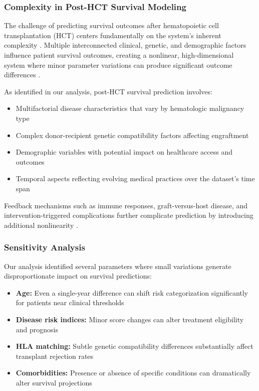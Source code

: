 \subsubsection{Complexity in Post-HCT Survival Modeling}

The challenge of predicting survival outcomes after hematopoietic cell transplantation (HCT) centers fundamentally on the system's inherent complexity \cite{astct_simplification}. Multiple interconnected clinical, genetic, and demographic factors influence patient survival outcomes, creating a nonlinear, high-dimensional system where minor parameter variations can produce significant outcome differences \cite{frontiers_ai_hct}.

As identified in our analysis, post-HCT survival prediction involves:

\begin{itemize}
    \item Multifactorial disease characteristics that vary by hematologic malignancy type \cite{ash_transplant_all}
    \item Complex donor-recipient genetic compatibility factors affecting engraftment \cite{mdpi_cells}
    \item Demographic variables with potential impact on healthcare access and outcomes \cite{jama_ai_medicine}
    \item Temporal aspects reflecting evolving medical practices over the dataset's time span \cite{mdpi_cancers}
\end{itemize}

Feedback mechanisms such as immune responses, graft-versus-host disease, and intervention-triggered complications further complicate prediction by introducing additional nonlinearity \cite{ash_chronic_gvhd}.

\subsubsection{Sensitivity Analysis}

Our analysis identified several parameters where small variations generate disproportionate impact on survival predictions:

\begin{itemize}
    \item \textbf{Age:} Even a single-year difference can shift risk categorization significantly for patients near clinical thresholds \cite{stmcls_clonality}
    \item \textbf{Disease risk indices:} Minor score changes can alter treatment eligibility and prognosis \cite{uptodate_hct}
    \item \textbf{HLA matching:} Subtle genetic compatibility differences substantially affect transplant rejection rates \cite{frontiers_immunology}
    \item \textbf{Comorbidities:} Presence or absence of specific conditions can dramatically alter survival projections \cite{mdpi_cancers}
\end{itemize}

